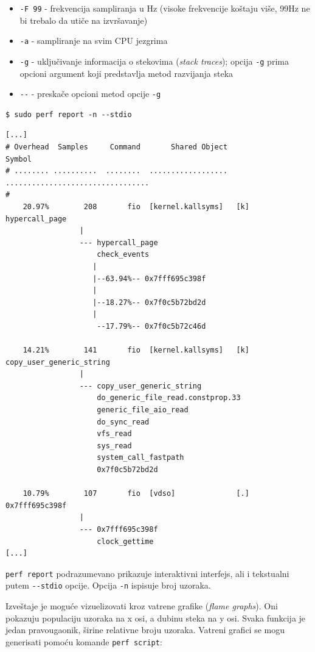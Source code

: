 \begin{itemize}
\tightlist
\item
  \texttt{-F\ 99} - frekvencija sampliranja u Hz (visoke frekvencije koštaju više, 99Hz ne bi trebalo da utiče na izvršavanje)
\item
  \texttt{-a} - sampliranje na svim CPU jezgrima
\item
  \texttt{-g} - uključivanje informacija o stekovima (\emph{stack traces}); opcija \texttt{-g} prima opcioni argument koji predstavlja metod razvijanja steka
\item
  \texttt{-\/-} - preskače opcioni metod opcije \texttt{-g}
\end{itemize}

\begin{verbatim}
$ sudo perf report -n --stdio
\end{verbatim}

\begin{verbatim}
[...]
# Overhead  Samples     Command       Shared Object                             Symbol
# ........ ..........  ........  ..................  .................................
#
    20.97%        208       fio  [kernel.kallsyms]   [k] hypercall_page
                 |
                 --- hypercall_page
                     check_events
                    |
                    |--63.94%-- 0x7fff695c398f
                    |
                    |--18.27%-- 0x7f0c5b72bd2d
                    |
                     --17.79%-- 0x7f0c5b72c46d

    14.21%        141       fio  [kernel.kallsyms]   [k] copy_user_generic_string
                 |
                 --- copy_user_generic_string
                     do_generic_file_read.constprop.33
                     generic_file_aio_read
                     do_sync_read
                     vfs_read
                     sys_read
                     system_call_fastpath
                     0x7f0c5b72bd2d

    10.79%        107       fio  [vdso]              [.] 0x7fff695c398f
                 |
                 --- 0x7fff695c398f
                     clock_gettime
[...]
\end{verbatim}

\texttt{perf\ report} podrazumevano prikazuje interaktivni interfejs, ali i tekstualni putem \texttt{-\/-stdio} opcije. Opcija \texttt{-n} ispisuje broj uzoraka.

Izveštaje je moguće vizuelizovati kroz vatrene grafike (\emph{flame graphs}). Oni pokazuju populaciju uzoraka na x osi, a dubinu steka na y osi. Svaka funkcija je jedan pravougaonik, širine relativne broju uzoraka. Vatreni grafici se mogu generisati pomoću komande \texttt{perf\ script}:

